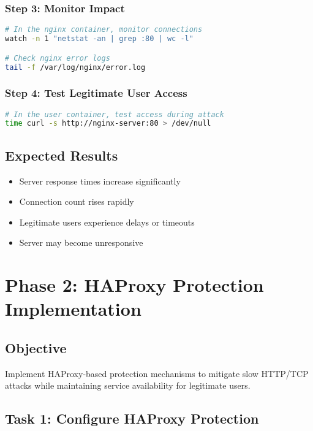 \documentclass[12pt]{article}
\begin{document}
\subsubsection{Step 3: Monitor Impact}
\begin{lstlisting}[language=bash]
# In the nginx container, monitor connections
watch -n 1 "netstat -an | grep :80 | wc -l"

# Check nginx error logs
tail -f /var/log/nginx/error.log
\end{lstlisting}

\subsubsection{Step 4: Test Legitimate User Access}
\begin{lstlisting}[language=bash]
# In the user container, test access during attack
time curl -s http://nginx-server:80 > /dev/null
\end{lstlisting}

\subsection{Expected Results}
\begin{itemize}
    \item Server response times increase significantly
    \item Connection count rises rapidly
    \item Legitimate users experience delays or timeouts
    \item Server may become unresponsive
\end{itemize}

\section{Phase 2: HAProxy Protection Implementation}

\subsection{Objective}
Implement HAProxy-based protection mechanisms to mitigate slow HTTP/TCP attacks while maintaining service availability for legitimate users.

\subsection{Task 1: Configure HAProxy Protection}
\end{document}
